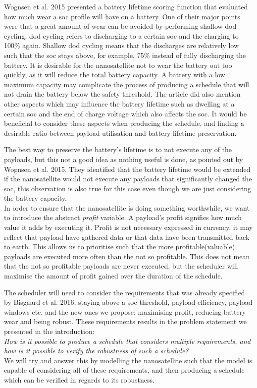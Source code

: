 Wognsen et al. 2015\cite{score_function} presented a battery lifetime scoring function that evaluated how much wear a \gls{soc} profile will have on a battery.
One of their major points were that a great amount of wear can be avoided by performing shallow \gls{dod} cycling.
\gls{dod} cycling refers to discharging to a certain \gls{soc} and the charging to 100\% again.
Shallow \gls{dod} cycling means that the discharges are relatively low such that the \gls{soc} stays above, for example, 75\% instead of fully discharging the battery.
It is desirable for the nanosatellite not to wear the battery out too quickly, as it will reduce the total battery capacity.
A battery with a low maximum capacity may complicate the process of producing a schedule that will not drain the battery below the safety threshold.
The article did also mention other aspects which may influence the battery lifetime such as dwelling at a certain \gls{soc} and the end of charge voltage which also affects the \gls{soc}.
It would be beneficial to consider these aspects when producing the schedule, and finding a desirable ratio between payload utilisation and battery lifetime preservation.

The best way to preserve the battery's lifetime is to not execute any of the payloads, but this not a good idea as nothing useful is done, as pointed out by Wognsen et al. 2015\cite{score_function}. 
They identified that the battery lifetime would be extended if the nanosatellite would not execute any payloads that significantly changed the \gls{soc}, this observation is also true for this case even though we are just considering the battery capacity.\\
In order to ensure that the nanosatellite is doing something worthwhile, we want to introduce the abstract \textit{profit} variable. 
A payload's profit signifies how much value it adds by executing it. 
Profit is not necessary expressed in currency, it may reflect that payload have gathered data or that data have been transmitted back to earth. 
This allows us to prioritise such that the more profitable(valuable) payloads are executed more often than the not so profitable.
This does not mean that the not so profitable payloads are never executed, but the scheduler will maximise the amount of profit gained over the duration of the schedule.

The scheduler will need to consider the requirements that was already specified by Bisgaard et al. 2016\cite{gomx3}, staying above a \gls{soc} threshold, payload efficiency, payload windows etc. and the new ones we propose: maximising profit, reducing battery wear and being robust. 
These requirements results in the problem statement we presented in the introduction:\\
\textit{How is it possible to produce a schedule that considers multiple requirements, and how is it possible to verify the robustness of such a schedule?}\\
We will try and answer this by modelling the nanosatellite such that the model is capable of considering all of these requirements, and then producing a schedule which can be verified in regards to its robustness.
